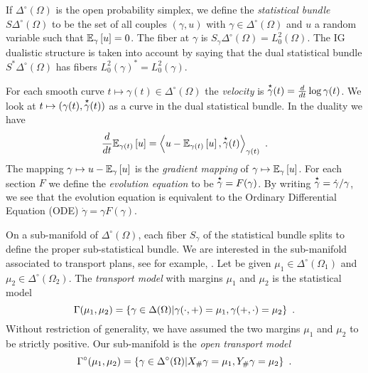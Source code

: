 \documentclass[runningheads]{llncs}
\begin{document}
If $\Delta^\circ(\Omega)$ is the open probability simplex, we define the \emph{statistical bundle} $S\Delta^\circ(\Omega)$ to be the set of all couples $(\gamma,u)$ with $\gamma \in \Delta^\circ(\Omega)$ and $u$ a random variable such that $\expectat \gamma u = 0$. The fiber at $\gamma$ is $S_\gamma\Delta^\circ(\Omega)= L^2_0(\Omega)$. The IG dualistic structure is taken into account by saying that the dual statistical bundle $S^*\Delta^\circ(\Omega)$ has fibers $L^2_0(\gamma)^* = L^2_0(\gamma)$.

For each smooth curve $t \mapsto \gamma(t) \in \Delta^\circ(\Omega)$ the \emph{velocity} is $\velocity \gamma(t) = \derivby t \log \gamma(t)$. We look at $t \mapsto (\gamma(t),\velocity \gamma(t))$ as a curve in the dual statistical bundle. In the duality we have
\begin{equation} \label{eq:1} \derivby t \expectat {\gamma(t)} u = \scalarat {\gamma(t)} {u - \expectat {\gamma(t)} u} {\velocity \gamma(t)} \ . \end{equation}
The mapping $\gamma \mapsto u - \expectat \gamma u$ is the \emph{gradient mapping} of $\gamma \mapsto \expectat \gamma u$.
For each section $F$ we define the \emph{evolution equation} to be $\velocity \gamma = F(\gamma)$. By writing $\velocity \gamma = \dot \gamma/\gamma$, we see that the evolution equation is equivalent to the Ordinary Differential Equation (ODE) $\dot \gamma = \gamma F(\gamma)$.

 
On a sub-manifold of $\Delta^\circ(\Omega)$, each fiber $S_\gamma$ of the statistical bundle splits to define the proper sub-statistical bundle. We are interested in the sub-manifold associated to transport plans, see for example, \cite{santambrogio:2015otap}. Let be given $\mu_1 \in \Delta^\circ(\Omega_1)$ and $\mu_2 \in \Delta^\circ(\Omega_2)$. The \emph{transport model} with margins $\mu_1$ and $\mu_2$ is the statistical model \begin{equation*} \Gamma(\mu_1,\mu_2) = \setof{\gamma \in \Delta(\Omega)}{\gamma(\cdot,+) = \mu_1, \gamma(+,\cdot) = \mu_2} \ . \end{equation*}
Without restriction of generality, we have assumed the two margins $\mu_1$ and $\mu_2$ to be strictly positive. Our sub-manifold is the \emph{open transport model} \begin{equation*} \Gamma^\circ(\mu_1,\mu_2) = \setof{\gamma \in \Delta^\circ(\Omega)}{X_\# \gamma = \mu_1, Y_\# \gamma = \mu_2} \ . \end{equation*}
\end{document}
